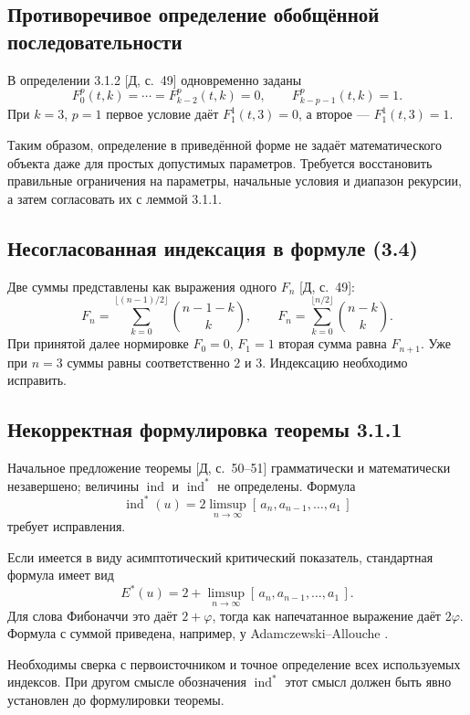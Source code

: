 \documentclass[12pt,a4paper]{article}
\newcommand{\ind}{\operatorname{ind}}
\newcommand{\sref}[1]{\textnormal{[Д, с.~#1]}}
\begin{document}
\subsection{Противоречивое определение обобщённой последовательности}

В определении 3.1.2 \sref{49} одновременно заданы
\[
  F_0^p(t,k)=\cdots=F_{k-2}^p(t,k)=0,
  \qquad F_{k-p-1}^p(t,k)=1.
\]
При $k=3$, $p=1$ первое условие даёт $F_1^1(t,3)=0$,
а второе --- $F_1^1(t,3)=1$.

Таким образом, определение в приведённой форме не задаёт математического
объекта даже для простых допустимых параметров. Требуется восстановить
правильные ограничения на параметры, начальные условия и диапазон
рекурсии, а затем согласовать их с леммой 3.1.1.

\subsection{Несогласованная индексация в формуле (3.4)}

Две суммы представлены как выражения одного $F_n$ \sref{49}:
\[
  F_n=\sum_{k=0}^{\lfloor(n-1)/2\rfloor}\binom{n-1-k}{k},
  \qquad
  F_n=\sum_{k=0}^{\lfloor n/2\rfloor}\binom{n-k}{k}.
\]
При принятой далее нормировке $F_0=0$, $F_1=1$ вторая сумма равна
$F_{n+1}$. Уже при $n=3$ суммы равны соответственно $2$ и $3$.
Индексацию необходимо исправить.

\subsection{Некорректная формулировка теоремы 3.1.1}

Начальное предложение теоремы \sref{50--51} грамматически
и математически незавершено; величины $\ind$ и $\ind^{*}$
не определены. Формула
\[
  \ind^{*}(u)=2\limsup_{n\to\infty}[\,a_n,a_{n-1},\ldots,a_1\,]
\]
требует исправления.

Если имеется в виду асимптотический критический показатель,
стандартная формула имеет вид
\[
  E^{*}(u)=2+\limsup_{n\to\infty}[\,a_n,a_{n-1},\ldots,a_1\,].
\]
Для слова Фибоначчи это даёт $2+\varphi$, тогда как напечатанное
выражение даёт $2\varphi$. Формула с суммой приведена, например,
у Adamczewski--Allouche \cite[разд.~4.3, замечание~11]{adamczewski}.

Необходимы сверка с первоисточником и точное определение всех
используемых индексов. При другом смысле обозначения $\ind^{*}$
этот смысл должен быть явно установлен до формулировки теоремы.
\end{document}

